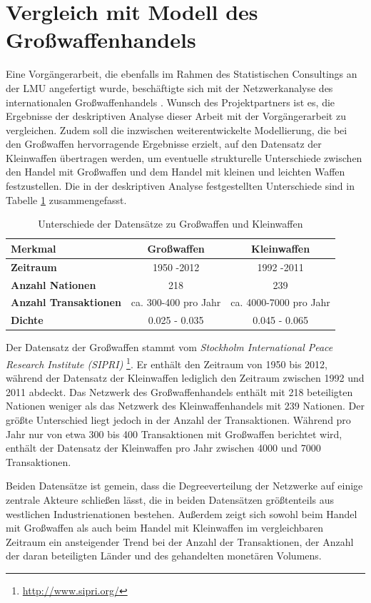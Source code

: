 \documentclass[a4paper,ngerman,oneside,titlepage,bibliography=totoc,11pt]{scrreprt}
\begin{document}
\section{Vergleich mit Modell des Großwaffenhandels}
Eine Vorgängerarbeit, die ebenfalls im Rahmen des Statistischen Consultings an der LMU angefertigt wurde, beschäftigte sich mit der Netzwerkanalyse des internationalen Großwaffenhandels \citep{js14}. Wunsch des Projektpartners ist es, die Ergebnisse der deskriptiven Analyse dieser Arbeit mit der Vorgängerarbeit zu vergleichen. Zudem soll die inzwischen weiterentwickelte Modellierung, die bei den Großwaffen hervorragende Ergebnisse erzielt, auf den Datensatz der Kleinwaffen übertragen werden, um eventuelle strukturelle Unterschiede zwischen den Handel mit Großwaffen und dem Handel mit kleinen und leichten Waffen  festzustellen. Die in der deskriptiven Analyse festgestellten Unterschiede sind in Tabelle \ref{tab:unterschied} zusammengefasst.
\begin{table}[h]
		\centering
			\begin{tabular}{|l|c|c|}
				\hline
				Merkmal & Großwaffen & Kleinwaffen \\
				\hline
				\textbf{Zeitraum} & 1950 -2012 & 1992 -2011 \\
				\textbf{Anzahl Nationen} & 218 & 239 \\
				\textbf{Anzahl Transaktionen} &ca. 300-400 pro Jahr &ca. 4000-7000 pro Jahr\\
				\textbf{Dichte} & 0.025 - 0.035& 0.045 - 0.065\\
				\hline
			\end{tabular}
			\caption{Unterschiede der Datensätze zu Großwaffen und Kleinwaffen}
			\label{tab:unterschied}
	\end{table}
Der Datensatz der Großwaffen stammt vom \emph{Stockholm International Peace Research Institute (SIPRI)} \footnote{\url{http://www.sipri.org/}}. Er enthält den Zeitraum von 1950 bis 2012, während der Datensatz der Kleinwaffen lediglich den Zeitraum zwischen 1992 und 2011 abdeckt. Das Netzwerk des Großwaffenhandels enthält mit 218 beteiligten Nationen weniger als das Netzwerk des Kleinwaffenhandels mit 239 Nationen. Der größte Unterschied liegt jedoch in der Anzahl der Transaktionen. Während pro Jahr nur von etwa 300 bis 400 Transaktionen mit Großwaffen berichtet wird, enthält der Datensatz der Kleinwaffen pro Jahr zwischen 4000 und 7000 Transaktionen.

Beiden Datensätze ist gemein, dass die Degreeverteilung der Netzwerke auf einige zentrale Akteure schließen lässt, die in beiden Datensätzen größtenteils aus westlichen Industrienationen bestehen. Außerdem zeigt sich sowohl beim Handel mit Großwaffen als auch beim Handel mit Kleinwaffen im vergleichbaren Zeitraum ein ansteigender Trend bei der Anzahl der Transaktionen, der Anzahl der daran beteiligten Länder und des gehandelten monetären Volumens.
\end{document}
